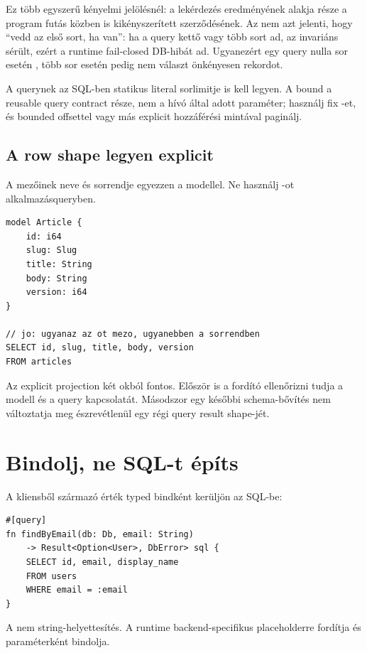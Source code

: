 Ez több egyszerű kényelmi jelölésnél: a lekérdezés eredményének alakja része a program futás közben is kikényszerített szerződésének. Az  nem azt jelenti, hogy ``vedd az első sort, ha van'': ha a query kettő vagy több sort ad, az invariáns sérült, ezért a runtime fail-closed DB-hibát ad. Ugyanezért egy  query nulla sor esetén , több sor esetén pedig nem választ önkényesen rekordot.

A  querynek az SQL-ben statikus literal sorlimitje is kell legyen. A bound a reusable query contract része, nem a hívó által adott  paraméter; használj fix -et, és bounded offsettel vagy más explicit hozzáférési mintával paginálj.

\subsection*{A row shape legyen explicit}

A  mezőinek neve és sorrendje egyezzen a modellel. Ne használj -ot alkalmazásqueryben.

\begin{lstlisting}[language=Velran]
model Article {
    id: i64
    slug: Slug
    title: String
    body: String
    version: i64
}

// jo: ugyanaz az ot mezo, ugyanebben a sorrendben
SELECT id, slug, title, body, version
FROM articles
\end{lstlisting}

Az explicit projection két okból fontos. Először is a fordító ellenőrizni tudja a modell és a query kapcsolatát. Másodszor egy későbbi schema-bővítés nem változtatja meg észrevétlenül egy régi query result shape-jét.

\section{Bindolj, ne SQL-t építs}

A kliensből származó érték typed bindként kerüljön az SQL-be:

\begin{lstlisting}[language=Velran]
#[query]
fn findByEmail(db: Db, email: String)
    -> Result<Option<User>, DbError> sql {
    SELECT id, email, display_name
    FROM users
    WHERE email = :email
}
\end{lstlisting}

A  nem string-helyettesítés. A runtime backend-specifikus placeholderre fordítja és paraméterként bindolja.

